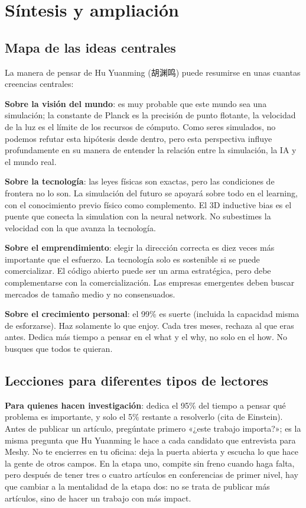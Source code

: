 \section{Síntesis y ampliación}

\subsection{Mapa de las ideas centrales}

La manera de pensar de Hu Yuanming (胡渊鸣) puede resumirse en unas cuantas creencias centrales:

\textbf{Sobre la visión del mundo}: es muy probable que este mundo sea una simulación; la constante de Planck es la precisión de punto flotante, la velocidad de la luz es el límite de los recursos de cómputo. Como seres simulados, no podemos refutar esta hipótesis desde dentro, pero esta perspectiva influye profundamente en su manera de entender la relación entre la simulación, la IA y el mundo real.

\textbf{Sobre la tecnología}: las leyes físicas son exactas, pero las condiciones de frontera no lo son. La simulación del futuro se apoyará sobre todo en el learning, con el conocimiento previo físico como complemento. El 3D inductive bias es el puente que conecta la simulation con la neural network. No subestimes la velocidad con la que avanza la tecnología.

\textbf{Sobre el emprendimiento}: elegir la dirección correcta es diez veces más importante que el esfuerzo. La tecnología solo es sostenible si se puede comercializar. El código abierto puede ser un arma estratégica, pero debe complementarse con la comercialización. Las empresas emergentes deben buscar mercados de tamaño medio y no consensuados.

\textbf{Sobre el crecimiento personal}: el 99\% es suerte (incluida la capacidad misma de esforzarse). Haz solamente lo que enjoy. Cada tres meses, rechaza al que eras antes. Dedica más tiempo a pensar en el what y el why, no solo en el how. No busques que todos te quieran.

\subsection{Lecciones para diferentes tipos de lectores}

\textbf{Para quienes hacen investigación}: dedica el 95\% del tiempo a pensar qué problema es importante, y solo el 5\% restante a resolverlo (cita de Einstein). Antes de publicar un artículo, pregúntate primero «¿este trabajo importa?»; es la misma pregunta que Hu Yuanming le hace a cada candidato que entrevista para Meshy. No te encierres en tu oficina: deja la puerta abierta y escucha lo que hace la gente de otros campos. En la etapa uno, compite sin freno cuando haga falta, pero después de tener tres o cuatro artículos en conferencias de primer nivel, hay que cambiar a la mentalidad de la etapa dos: no se trata de publicar más artículos, sino de hacer un trabajo con más impact.

